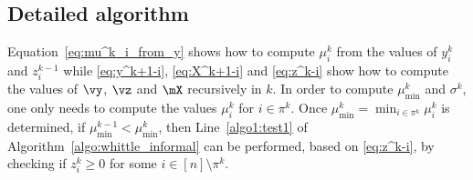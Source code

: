 \subsection{Detailed algorithm}
\label{ssec:two_third_algo}

Equation~\eqref{eq:mu^k_i_from_y} shows how to compute $\mu^k_i$ from the values of $y^{k}_i$ and $z^{k-1}_i$ while \eqref{eq:y^k+1-i}, \eqref{eq:X^k+1-i} and \eqref{eq:z^k-i} show how to compute the values of $\vy$, $\vz$ and $\mX$ recursively in $k$. In order to compute $\mu^k_{\min}$ and $\sigma^k$, one only needs to compute the values $\mu^k_i$ for $i\in\pi^{k}$.  Once $\mu^k_{\min}=\min_{i\in\pi^k}\mu^k_i$ is determined, if $\mu^{k-1}_{\min} <\mu^k_{\min}$, then Line~\ref{algo1:test1} of Algorithm~\ref{algo:whittle_informal} can be performed, based on \eqref{eq:z^k-i}, by checking if $z^{k}_i \ge 0$ for some $i\in[n]\setminus\pi^{k}$.

